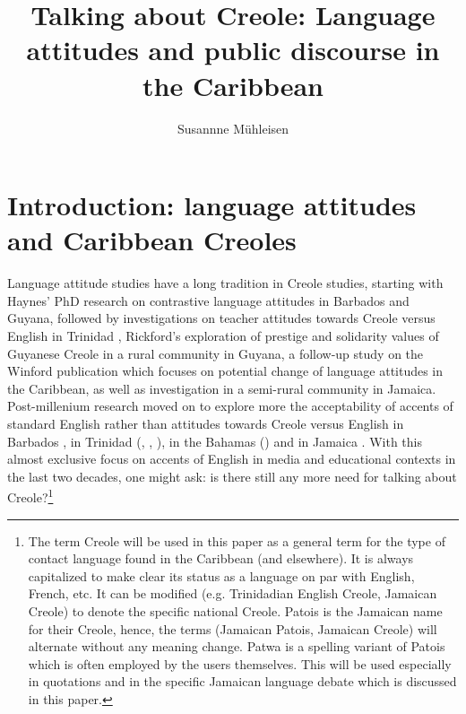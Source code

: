 \documentclass[output=paper,colorlinks,citecolor=brown]{langscibook}
\author{Susannne Mühleisen\affiliation{Universität Bayreuth}}
\title{Talking about Creole: Language attitudes and public discourse in the Caribbean}
\begin{document}
\maketitle

\section{Introduction: language attitudes and Caribbean Creoles}\label{sec:muehleisen:1}

Language attitude studies have a long tradition in Creole studies, starting with Haynes’ \citeyearpar{haynes1973language} PhD research on contrastive language attitudes in Barbados and Guyana, followed by investigations on teacher attitudes towards Creole versus English in Trinidad \citep{winford1976teacher}, Rickford's \citeyear{rickford1983standard} exploration of prestige and solidarity values of Guyanese Creole in a rural community in Guyana, a follow-up study on the Winford publication \citep{mühleisen1993attitudes,mühleisen2001bad} which focuses on potential change of language attitudes in the Caribbean, as well as  investigation in a semi-rural community in Jamaica. Post-millenium research moved on to explore more the acceptability of accents of standard English rather than attitudes towards Creole versus English in Barbados \citep{belgrave2008attitudes}, in Trinidad (\citealt{deuber2013towards}, \citealt{deuber2013investigating}, \citealt{meer2019trinidadian}), in the Bahamas (\citealt{oenbring_fielding2014}) and in Jamaica \citep{westphal2015attitudes}. With this almost exclusive focus on accents of English in media and educational contexts in the last two decades, one might ask: is there still any more need for talking about Creole?\footnote{The term Creole will be used in this paper as a general term for the type of contact language found in the Caribbean (and elsewhere). It is always capitalized to make clear its status as a language on par with English, French, etc. It can be modified (e.g. Trinidadian English Creole, Jamaican Creole) to denote the specific national Creole. Patois is the Jamaican name for their Creole, hence, the terms (Jamaican Patois, Jamaican Creole) will alternate without any meaning change. Patwa is a spelling variant of Patois which is often employed by the users themselves. This will be used especially in quotations and in the specific Jamaican language debate which is discussed in this paper.}
\end{document}
